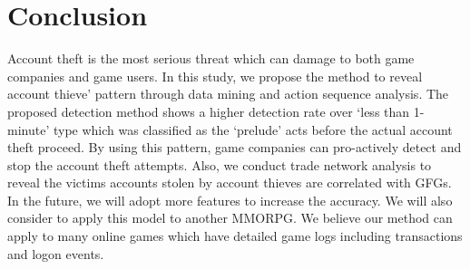 \documentclass[conference]{IEEEtran}
\begin{document}
\section{Conclusion}
\label{section:conclusion}
Account theft is the most serious threat which can damage to both game companies and game users. 
In this study, we propose the method to reveal account thieve' pattern through data mining and action sequence analysis.  %
The proposed detection method shows a higher detection rate over `less than 1-minute' type which was classified as the `prelude' acts before the actual account theft proceed. By using this pattern, game companies can pro-actively detect and stop the account theft attempts.  %
Also, we conduct trade network analysis to reveal the victims accounts stolen by account thieves are correlated with GFGs. %
In the future, we will adopt more  features to increase the accuracy. We will also consider to apply this model to another MMORPG. We believe our method can apply to many online games which have detailed game logs including transactions and logon events. %





\end{document}
